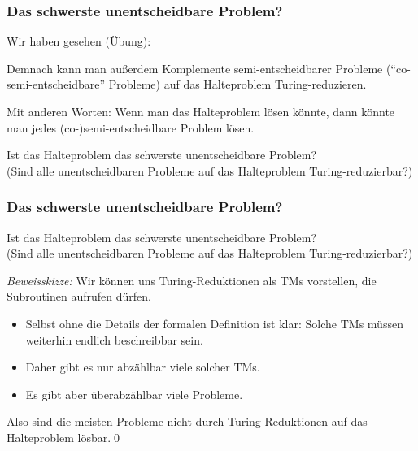 \documentclass[onlymath]{beamer}
\begin{document}
\begin{frame}\frametitle{Das schwerste unentscheidbare Problem?}

Wir haben gesehen (Übung):\smallskip

\medskip\pause

Demnach kann man außerdem Komplemente semi-entscheidbarer Probleme ("`co-semi-entscheidbare"' Probleme) auf das Halteproblem Turing-reduzieren.\bigskip

Mit anderen Worten: Wenn man das Halteproblem lösen könnte, dann könnte man
jedes (co-)semi-entscheidbare Problem lösen.\pause

\begin{center}
\alert{Ist das Halteproblem das schwerste unentscheidbare Problem?}\\
{\tiny (Sind alle unentscheidbaren Probleme auf das Halteproblem Turing-reduzierbar?)}
\end{center}

\end{frame}

\begin{frame}\frametitle{Das schwerste unentscheidbare Problem?}

\begin{center}
\alert{Ist das Halteproblem das schwerste unentscheidbare Problem?}\\
{\tiny (Sind alle unentscheidbaren Probleme auf das Halteproblem Turing-reduzierbar?)}
\end{center}

\bigskip
\pause {}
\bigskip\pause

\emph{Beweisskizze:} Wir können uns Turing-Reduktionen als TMs vorstellen, die Subroutinen
aufrufen dürfen.

\begin{itemize}
\item Selbst ohne die Details der formalen Definition ist klar: Solche TMs müssen weiterhin
endlich beschreibbar sein.
\item Daher gibt es nur abzählbar viele solcher TMs.
\item Es gibt aber überabzählbar viele Probleme.
\end{itemize}

Also sind die meisten Probleme nicht durch Turing-Reduktionen auf das Halteproblem
lösbar.\qed

\end{frame}
\end{document}
